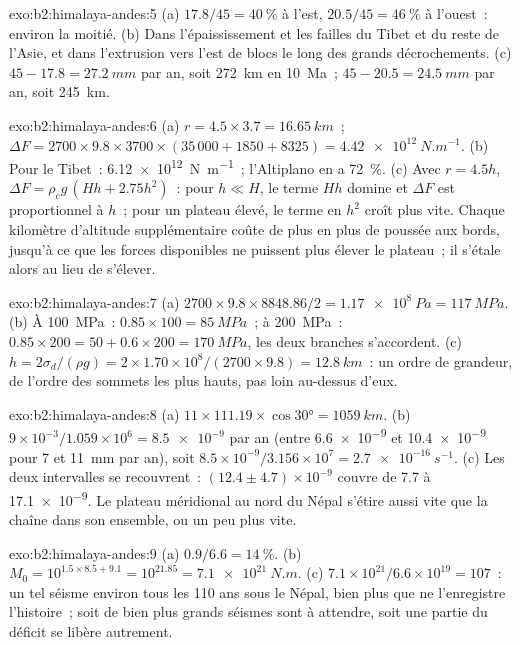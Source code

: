 \begin{solution}{exo:b2:himalaya-andes:5}
(a) $17.8/45 = \qty{40}{\percent}$ à l'est, $20.5/45 = \qty{46}{\percent}$ à l'ouest~:
environ la moitié. (b) Dans l'épaississement et les failles du Tibet et du reste de l'Asie,
et dans l'extrusion vers l'est de blocs le long des grands décrochements. (c) $45 - 17.8 =
\qty{27.2}{mm}$ par an, soit \qty{272}{km} en \qty{10}{Ma}~;
$45 - 20.5 = \qty{24.5}{mm}$ par an, soit \qty{245}{km}.
\end{solution}

\begin{solution}{exo:b2:himalaya-andes:6}
(a) $r = 4.5\times3.7 = \qty{16.65}{km}$~;
$\Delta F = 2700\times9.8\times3700\times(35\,000 +
1850 + 8325) = \qty{4.42e12}{N.m^{-1}}$. (b) Pour le Tibet~: \qty{6.12e12}{N.m^{-1}}~; l'Altiplano en a
\qty{72}{\percent}. (c) Avec $r = 4.5h$, $\Delta F = \rho_c g\,(Hh + 2.75h^2)$~: pour $h \ll H$, le terme
$Hh$ domine et $\Delta F$ est proportionnel à $h$~; pour un plateau élevé, le terme en $h^2$ croît plus
vite. Chaque kilomètre d'altitude supplémentaire coûte de plus en plus de poussée aux bords, jusqu'à
ce que les forces disponibles ne puissent plus élever le plateau~; il s'étale alors au lieu de s'élever.
\end{solution}

\begin{solution}{exo:b2:himalaya-andes:7}
(a) $2700\times9.8\times8848.86/2 = \qty{1.17e8}{Pa} = \qty{117}{MPa}$. (b) À
\qty{100}{MPa}~: $0.85\times100 = \qty{85}{MPa}$~; à \qty{200}{MPa}~: $0.85\times200 = 50 +
0.6\times200 = \qty{170}{MPa}$, les deux branches s'accordent. (c) $h = 2\sigma_d/(\rho g) =
2\times1.70\times10^8/(2700\times9.8) = \qty{12.8}{km}$~: un ordre de
grandeur, de l'ordre des sommets les plus hauts, pas loin au-dessus d'eux.
\end{solution}

\begin{solution}{exo:b2:himalaya-andes:8}
(a) $11\times111.19\times\cos\ang{30} = \qty{1059}{km}$.
(b) $9\times10^{-3}/1.059\times10^{6}
= \num{8.5e-9}$ par an (entre \num{6.6e-9} et \num{10.4e-9} pour 7 et \qty{11}{mm} par an), soit
$8.5\times10^{-9}/3.156\times10^{7} = \qty{2.7e-16}{s^{-1}}$. (c) Les deux intervalles se recouvrent~: $(12.4 \pm 4.7) \times 10^{-9}$ couvre de 7.7 à
\num{17.1e-9}. Le plateau méridional au nord du Népal s'étire aussi vite que la chaîne dans son ensemble, ou un peu plus vite.
\end{solution}

\begin{solution}{exo:b2:himalaya-andes:9}
(a) $0.9/6.6 = \qty{14}{\percent}$. (b) $M_0 = 10^{1.5\times8.5 + 9.1} = 10^{21.85} =
\qty{7.1e21}{N.m}$. (c) $7.1\times10^{21}/6.6\times10^{19} = 107$~: un tel séisme environ
tous les 110 ans sous le Népal, bien plus que ne l'enregistre l'histoire~; soit de bien
plus grands séismes sont à attendre, soit une partie du déficit se libère autrement.
\end{solution}

